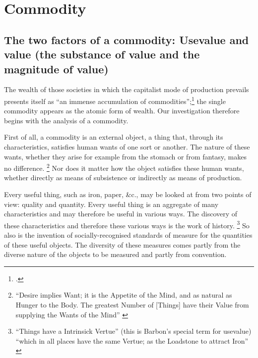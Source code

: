\chapter{Commodity}

\section{The two factors of a commodity:
Usevalue and value
(the substance of value and the magnitude of value)}


The wealth of those societies 
in which the capitalist mode of production prevails
presents itself
as \enquote{an immense accumulation of commodities};\footcite{fn01}
the single commodity appears as the atomic form of wealth.
Our investigation therefore begins
with the analysis of a commodity.

First of all,
a commodity is an external object,
a thing that,
through its characteristics,
satisfies human wants of one sort or another. 
The nature of these wants, 
whether they arise
for example
from the stomach or from fantasy, makes no difference.%
\footnote{\enquote{Desire implies Want; 
it is the Appetite of the Mind,
and as natural as Hunger to the Body.
\textelp{}
The greatest Number of [Things]
have their Value from supplying 
the Wants of the Mind} 
\citep[2--3]{fn02}}
Nor does it matter
how the object satisfies these human wants, 
whether directly as means of subsistence 
or indirectly as means of production.

Every useful thing, such as iron, paper, \&c., 
may be looked at from two points of view: quality and quantity.
Every useful thing is an aggregate of many characteristics
and may therefore be useful in various ways.
The discovery of these characteristics and 
therefore these various ways 
is the work of history.%
\footnote{
    \enquote{Things have a Intrinsick Vertue}
    (this is Barbon's special term for usevalue)
    \enquote{which in all places have the same Vertue;
    as the Loadstone to attract Iron}
    \citep[6]{fn02}
}
So also is the invention of socially-recognised standards of measure
for the quantities of these useful objects.
The diversity of these measures comes
partly from the diverse nature of the objects to be measured
and partly from convention.

